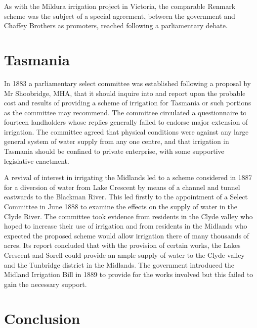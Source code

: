 As with the Mildura irrigation project in Victoria, the comparable
Renmark scheme was the subject of a special agreement, between the
government and Chaffey Brothers as promoters, reached following a
parliamentary debate.

\section*{Tasmania}

In 1883 a parliamentary select committee was established following a
proposal by Mr Shoobridge, MHA, that it should inquire into and report
upon the probable cost and results of providing a scheme of irrigation
for Tasmania or such portions as the committee may recommend.  The
committee circulated a questionnaire to fourteen landholders whose
replies generally failed to endorse major extension of irrigation.
The committee agreed that physical conditions were against any large
general system of water supply from any one centre, and that
irrigation in Tasmania should be confined to private enterprise, with
some supportive legislative enactment.

A revival of interest in irrigating the Midlands led to a scheme
considered in 1887 for a diversion of water from Lake Crescent by
means of a channel and tunnel eastwards to the Blackman River.  This
led firstly to the appointment of a Select Committee in June 1888 to
examine the effects on the supply of water in the Clyde River.  The
committee took evidence from residents in the Clyde valley who hoped
to increase their use of irrigation and from residents in the Midlands
who expected the proposed scheme would allow irrigation there of many
thousands of acres.  Its report concluded that with the provision of
certain works, the Lakes Crescent and Sorell could provide an ample
supply of water to the Clyde valley and the Tunbridge district in the
Midlands.
The government introduced the Midland Irrigation Bill in 1889 to
provide for the works involved but this failed to gain the necessary
support.

\section*{Conclusion}

